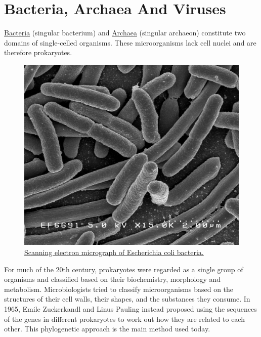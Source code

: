 \hypertarget{bacteria-archaea-and-viruses}{%
\chapter{Bacteria, Archaea And Viruses}\label{bacteria-archaea-and-viruses}}

\href{https://en.wikipedia.org/wiki/Bacteria}{Bacteria} (singular bacterium) and \href{https://en.wikipedia.org/wiki/Archaea}{Archaea} (singular archaeon) constitute two domains of single-celled organisms. These microorganisms lack cell nuclei and are therefore prokaryotes.



\begin{figure}

{\centering \includegraphics[width=0.7\linewidth]{./figures/bacteria/EscherichiaColi_NIAID} 

}

\caption{\href{https://commons.wikimedia.org/wiki/File:EscherichiaColi_NIAID.jpg}{Scanning electron micrograph of Escherichia coli bacteria.}}\label{fig:semecoli}
\end{figure}

For much of the 20th century, prokaryotes were regarded as a single group of organisms and classified based on their biochemistry, morphology and metabolism. Microbiologists tried to classify microorganisms based on the structures of their cell walls, their shapes, and the substances they consume. In 1965, Emile Zuckerkandl and Linus Pauling instead proposed using the sequences of the genes in different prokaryotes to work out how they are related to each other. This phylogenetic approach is the main method used today.

